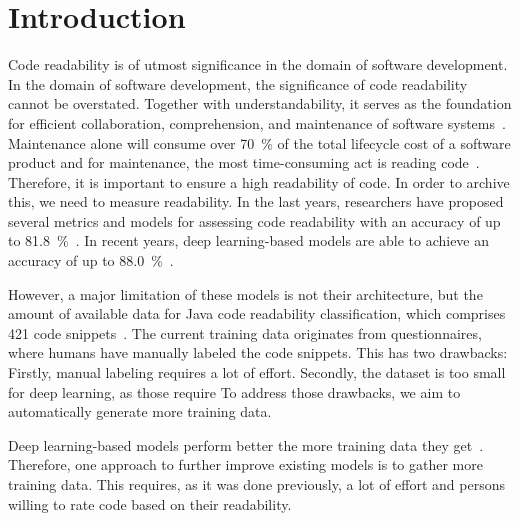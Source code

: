 \documentclass[%
class=scrreprt,
chapterprefix=false,%
open=right,%
twoside=false,%
paper=a4,%
logofile={Logo\_zentral\_farbig\_EN.png},%
thesistype=master,%
UKenglish,%
]{se2thesis}
\theoremstyle{definition}
\newcommand{\citeclassicmodels}{\cite{buse2009learning, posnett2011simpler, dorn2012general, scalabrino2018comprehensive}}
\newcommand{\citedeepmodels}{\cite{mi2018inception, mi2018improving, sharma2020egan, mi2022towards, mi2022rank, mi2023graph}}
\newcommand{\citeolddataset}{\cite{buse2009learning, dorn2012general, scalabrino2018comprehensive}}
\begin{document}
	\mainmatter
	
	\tableofcontents

\pagebreak
\section{Introduction} \label{Introduction}

	Code readability is of utmost significance in the domain of software development.
	In the domain of software development, the significance of code readability cannot be overstated. Together with understandability, it serves as the foundation for efficient collaboration, comprehension, and maintenance of software systems~\cite{posnett2011simpler, aggarwal2002integrated}. 
	Maintenance alone will consume over 70~\% of the total lifecycle cost of a software product and for maintenance, the most time-consuming act is reading code~\cite{buse2009learning, deimel1985uses, rugaber2000use, boehm2001defect}.
	Therefore, it is important to ensure a high readability of code. In order to archive this, we need to measure readability.
	In the last years, researchers have proposed several metrics and models for assessing code readability with an accuracy of up to 81.8~\%~\citeclassicmodels. In recent years, deep learning-based models are able to achieve an accuracy of up to 88.0~\%~\citedeepmodels.
	
	However, a major limitation of these models is not their architecture, but the amount of available data for Java code readability classification, which comprises 421 code snippets~\citeolddataset. The current training data originates from questionnaires, where humans have manually labeled the code snippets. This has two drawbacks: Firstly, manual labeling requires a lot of effort. Secondly, the dataset is too small for deep learning, as those require 
	To address those drawbacks, we aim to automatically generate more training data.
	
	Deep learning-based models perform better the more training data they get~\cite{hestness2017deep}. Therefore, one approach to further improve existing models is to gather more training data.
	This requires, as it was done previously, a lot of effort and persons willing to rate code based on their readability.
	
\end{document}
